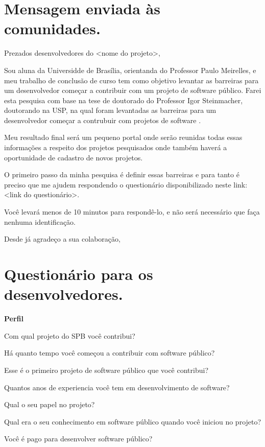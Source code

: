 \begin{anexosenv}

\partanexos

\chapter{Mensagem enviada às comunidades.}
\label{anexo a}

Prezados desenvolvedores do <nome do projeto>,

Sou aluna da Universidde de Brasília, orientanda do Professor
Paulo Meirelles, e meu trabalho de conclusão de curso tem como 
objetivo levantar as barreiras para um desenvolvedor 
começar a contribuir com um projeto de software público. Farei esta pesquisa 
com base na tese de doutorado do Professor Igor Steinmacher, doutorando na USP,
na qual foram levantadas as barreiras para um desenvolvedor começar a contrubuir 
com projetos de software .

Meu resultado final será um pequeno portal onde serão reunidas todas essas informações
a respeito dos projetos pesquisados onde também haverá a oportunidade de cadastro de
novos projetos.

O primeiro passo da minha pesquisa é definir essas barreiras e para tanto é
preciso que me ajudem respondendo o questionário disponibilizado neste link:
<link do questionário>.

Você levará menos de 10 minutos para respondê-lo, e não será necessário que faça
nenhuma identificação.

Desde já agradeço a sua colaboração,

\chapter{Questionário para os desenvolvedores.}
\label{anexo b}

\textbf{Perfil}

Com qual projeto do SPB você contribui?

Há quanto tempo você começou a contribuir com software público?

Esse é o primeiro projeto de software público que você contribui?

Quantos anos de experiencia você tem em desenvolvimento de software?

Qual o seu papel no projeto?

Qual era o seu conhecimento em software público quando você iniciou no projeto?

Você é pago para desenvolver software público?


\end{anexosenv}
